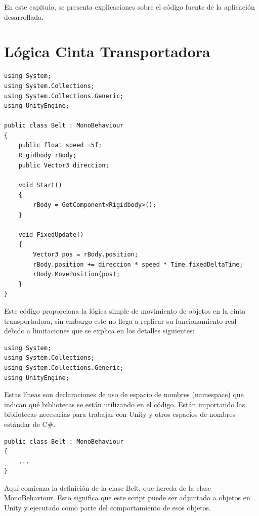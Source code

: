 En este capitulo, se presenta explicaciones sobre el código fuente de la aplicación desarrollada.
\section{Lógica Cinta Transportadora}
\lstset{language=[Sharp]C, breaklines=true, basicstyle=\footnotesize}
\begin{lstlisting}[frame=single]
using System;
using System.Collections;
using System.Collections.Generic;
using UnityEngine;

public class Belt : MonoBehaviour
{
    public float speed =5f;
    Rigidbody rBody;
    public Vector3 direccion;

    void Start()
    {
        rBody = GetComponent<Rigidbody>();
    }

    void FixedUpdate()
    {
        Vector3 pos = rBody.position;
        rBody.position += direccion * speed * Time.fixedDeltaTime;
        rBody.MovePosition(pos);
    }
}
\end{lstlisting}
Este código proporciona la lógica simple de movimiento de objetos en la cinta transportadora, sin embargo este no llega a replicar su funcionamiento real debido a limitaciones que se explica en los detalles siguientes:

\begin{lstlisting}[frame=single]
using System;
using System.Collections;
using System.Collections.Generic;
using UnityEngine;
\end{lstlisting}
Estas líneas son declaraciones de uso de espacio de nombres (namespace) que indican qué bibliotecas se están utilizando en el código. Están importando las bibliotecas necesarias para trabajar con Unity y otros espacios de nombres estándar de C\#.

\begin{lstlisting}[frame=single]
public class Belt : MonoBehaviour
{
    ...
}
\end{lstlisting}
Aquí comienza la definición de la clase Belt, que hereda de la clase MonoBehaviour. Esto significa que este script puede ser adjuntado a objetos en Unity y ejecutado como parte del comportamiento de esos objetos.

